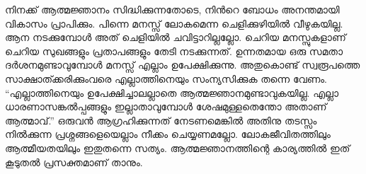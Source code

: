 നിനക്ക് ആത്മജ്ഞാനം സിദ്ധിക്കുന്നതോടെ, നിന്‍റെ ബോധം അനന്തമായി വികാസം പ്രാപിക്കും. പിന്നെ മനസ്സ്‌ ലോകമെന്ന ചെളിക്കുഴിയില്‍ വീഴുകയില്ല. ആന നടക്കുമ്പോള്‍ അത് ചെളിയില്‍ ചവിട്ടാറില്ലല്ലോ. ചെറിയ മനസ്സുകളാണ് ചെറിയ സുഖങ്ങളും പ്രതാപങ്ങളും തേടി നടക്കുന്നത്. ഉന്നതമായ ഒരു സമതാ ദര്‍ശനമുണ്ടാവുമ്പോള്‍ മനസ്സ്‌ എല്ലാം ഉപേക്ഷിക്കുന്നു. അതുകൊണ്ട് സ്വരൂപത്തെ സാക്ഷാത്ക്കരിക്കുംവരെ എല്ലാത്തിനെയും സംന്യസിക്കുക തന്നെ വേണം. “എല്ലാത്തിനെയും ഉപേക്ഷിച്ചാലല്ലാതെ ആത്മജ്ഞാനമുണ്ടാവുകയില്ല. എല്ലാ ധാരണാസങ്കല്‍പ്പങ്ങളും ഇല്ലാതാവുമ്പോള്‍ ശേഷമുള്ളതെന്തോ അതാണ്‌ ആത്മാവ്.” ഒരുവന്‍ ആഗ്രഹിക്കുന്നത് നേടണമെങ്കില്‍ അതിനു തടസ്സം നില്‍ക്കുന്ന പ്രശ്നങ്ങളെയെല്ലാം നീക്കം ചെയ്യണമല്ലോ. ലോകജീവിതത്തിലും ആത്മീയതയിലും ഇതുതന്നെ സത്യം. ആത്മജ്ഞാനത്തിന്റെ കാര്യത്തില്‍ ഇത് കൂടുതല്‍ പ്രസക്തമാണ് താനും.
